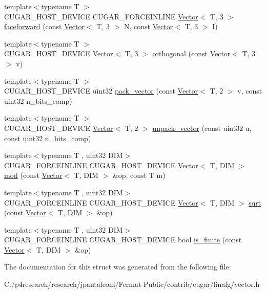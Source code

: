 \begin{DoxyCompactItemize}
\item 
{\footnotesize template$<$typename T $>$ }\\C\+U\+G\+A\+R\+\_\+\+H\+O\+S\+T\+\_\+\+D\+E\+V\+I\+CE C\+U\+G\+A\+R\+\_\+\+F\+O\+R\+C\+E\+I\+N\+L\+I\+NE \hyperlink{structcugar_1_1_vector}{Vector}$<$ T, 3 $>$ \hyperlink{group___vectors_module_ga62cacaa60db461c2298a9a51ab9128bc}{faceforward} (const \hyperlink{structcugar_1_1_vector}{Vector}$<$ T, 3 $>$ N, const \hyperlink{structcugar_1_1_vector}{Vector}$<$ T, 3 $>$ I)
\item 
{\footnotesize template$<$typename T $>$ }\\C\+U\+G\+A\+R\+\_\+\+H\+O\+S\+T\+\_\+\+D\+E\+V\+I\+CE \hyperlink{structcugar_1_1_vector}{Vector}$<$ T, 3 $>$ \hyperlink{group___vectors_module_gadb782eb379c7b928c89790191e3bd692}{orthogonal} (const \hyperlink{structcugar_1_1_vector}{Vector}$<$ T, 3 $>$ v)
\item 
{\footnotesize template$<$typename T $>$ }\\C\+U\+G\+A\+R\+\_\+\+H\+O\+S\+T\+\_\+\+D\+E\+V\+I\+CE uint32 \hyperlink{group___vectors_module_ga338c773d1de0c975ff611a6a56782976}{pack\+\_\+vector} (const \hyperlink{structcugar_1_1_vector}{Vector}$<$ T, 2 $>$ v, const uint32 n\+\_\+bits\+\_\+comp)
\item 
{\footnotesize template$<$typename T $>$ }\\C\+U\+G\+A\+R\+\_\+\+H\+O\+S\+T\+\_\+\+D\+E\+V\+I\+CE \hyperlink{structcugar_1_1_vector}{Vector}$<$ T, 2 $>$ \hyperlink{group___vectors_module_gafdac23f56276bd0a852d92a786723633}{unpack\+\_\+vector} (const uint32 u, const uint32 n\+\_\+bits\+\_\+comp)
\item 
{\footnotesize template$<$typename T , uint32 D\+IM$>$ }\\C\+U\+G\+A\+R\+\_\+\+F\+O\+R\+C\+E\+I\+N\+L\+I\+NE C\+U\+G\+A\+R\+\_\+\+H\+O\+S\+T\+\_\+\+D\+E\+V\+I\+CE \hyperlink{structcugar_1_1_vector}{Vector}$<$ T, D\+IM $>$ \hyperlink{group___vectors_module_gaa57bce082b9fdb795f14b78abe5dd4f9}{mod} (const \hyperlink{structcugar_1_1_vector}{Vector}$<$ T, D\+IM $>$ \&op, const T m)
\item 
{\footnotesize template$<$typename T , uint32 D\+IM$>$ }\\C\+U\+G\+A\+R\+\_\+\+F\+O\+R\+C\+E\+I\+N\+L\+I\+NE C\+U\+G\+A\+R\+\_\+\+H\+O\+S\+T\+\_\+\+D\+E\+V\+I\+CE \hyperlink{structcugar_1_1_vector}{Vector}$<$ T, D\+IM $>$ \hyperlink{group___vectors_module_ga82ffe653d8df9532076d7c6c9f254291}{sqrt} (const \hyperlink{structcugar_1_1_vector}{Vector}$<$ T, D\+IM $>$ \&op)
\item 
{\footnotesize template$<$typename T , uint32 D\+IM$>$ }\\C\+U\+G\+A\+R\+\_\+\+F\+O\+R\+C\+E\+I\+N\+L\+I\+NE C\+U\+G\+A\+R\+\_\+\+H\+O\+S\+T\+\_\+\+D\+E\+V\+I\+CE bool \hyperlink{group___vectors_module_gaf2a8279368671ac3504889251ac8ddc6}{is\+\_\+finite} (const \hyperlink{structcugar_1_1_vector}{Vector}$<$ T, D\+IM $>$ \&op)
\end{DoxyCompactItemize}


The documentation for this struct was generated from the following file\+:\begin{DoxyCompactItemize}
\item 
C\+:/p4research/research/jpantaleoni/\+Fermat-\/\+Public/contrib/cugar/linalg/vector.\+h\end{DoxyCompactItemize}
